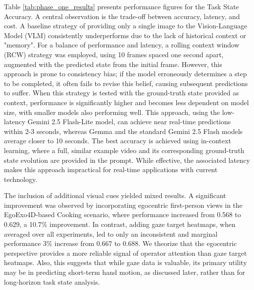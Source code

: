 \documentclass[biomimetics,article,submit,pdftex,moreauthors]{Definitions/mdpi}
\begin{document}
Table \ref{tab:phase_one_results} presents performance figures for the Task State Accuracy. A central observation is the trade-off between accuracy, latency, and cost. A baseline strategy of providing only a single image to the Vision-Language Model (VLM) consistently underperforms due to the lack of historical context or "memory". For a balance of performance and latency, a rolling context window (RCW) strategy was employed, using 10 frames spaced one second apart, augmented with the predicted state from the initial frame. However, this approach is prone to consistency bias; if the model erroneously determines a step to be completed, it often fails to revise this belief, causing subsequent predictions to suffer. When this strategy is tested with the ground-truth state provided as context, performance is significantly higher and becomes less dependent on model size, with smaller models also performing well. This approach, using the low-latency Gemini 2.5 Flash-Lite model, can achieve near real-time predictions within 2-3 seconds, whereas Gemma and the standard Gemini 2.5 Flash models average closer to 10 seconds.
The best accuracy is achieved using in-context learning, where a full, similar example video and its corresponding ground-truth state evolution are provided in the prompt. While effective, the associated latency makes this approach impractical for real-time applications with current technology. 

The inclusion of additional visual cues yielded mixed results. A significant improvement was observed by incorporating egocentric first-person views in the EgoExo4D-based Cooking scenario, where performance increased from 0.568 to 0.629, a 10.7\% improvement.  In contrast, adding gaze target heatmaps, when averaged over all experiments, led to only an inconsistent and marginal performance 3\% increase from 0.667 to 0.688. We theorize that the egocentric perspective provides a more reliable signal of operator attention than gaze target heatmaps. Also, this suggests that while gaze data is valuable, its primary utility may be in predicting short-term hand motion, as discussed later, rather than for long-horizon task state analysis.
\end{document}
